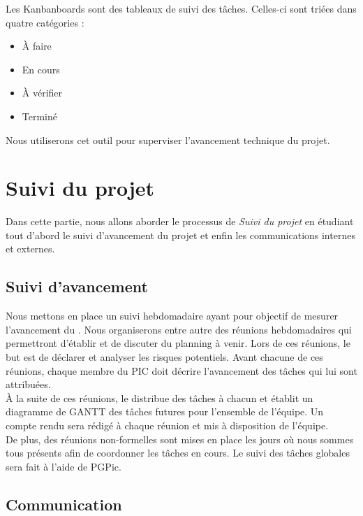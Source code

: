 Les Kanbanboards sont des tableaux de suivi des tâches. Celles-ci sont triées dans quatre catégories :
\begin{itemize}
\item \`A faire
\item En cours
\item \`A vérifier
\item Terminé \\ 
\end{itemize}

Nous utiliserons cet outil pour superviser l'avancement technique du projet.

\section{Suivi du projet} 
\label{suivi_projet}

Dans cette partie, nous allons aborder le processus de \textit{Suivi du projet} en étudiant tout d'abord le suivi d'avancement du projet et enfin les communications internes et externes.  

\subsection{Suivi d'avancement}
\label{suivi_avancement}

Nous mettons en place un suivi hebdomadaire ayant pour objectif de mesurer l'avancement du \PICCourt. Nous organiserons entre autre des réunions hebdomadaires qui permettront d'établir et de discuter du planning à venir. Lors de ces réunions, le but est de déclarer et analyser les risques potentiels. Avant chacune de ces réunions, chaque membre du PIC doit décrire l'avancement des tâches qui lui sont attribuées.\\

À la suite de ces réunions, le \CP{} distribue des tâches à chacun et établit un diagramme de GANTT des tâches futures pour l'ensemble de l'équipe. Un compte rendu sera rédigé à chaque réunion et mis à disposition de l'équipe. \\

De plus, des réunions non-formelles sont mises en place les jours où nous sommes tous présents afin de coordonner les tâches en cours. Le suivi des tâches globales sera fait à l’aide de PGPic.

\subsection{Communication}
\label{communication}

